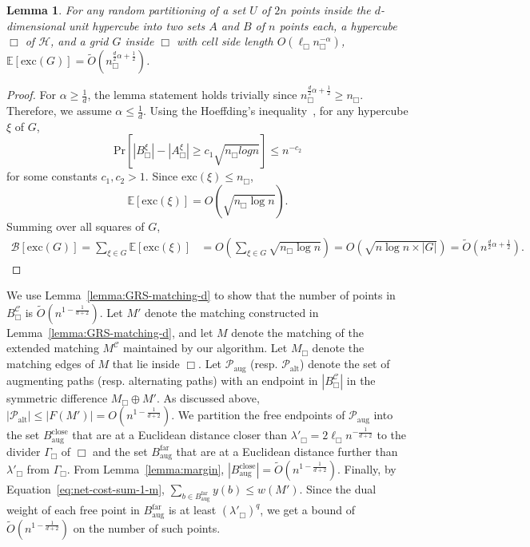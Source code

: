 \documentclass[11pt,onecolumn]{article}
\def\mcB{{\mathcal{B}}}
\def\mcC{{\mathcal{C}}}
\def\mcH{{\mathcal{H}}}
\def\mcP{{\mathcal{P}}}
\def\mbE{{\mathbb{E}}}
\newcommand{\cell}{\Box}
\newcommand{\excess}{\mathrm{exc}}
\newcommand{\prob}[1]{\mathrm{Pr}\left[#1\right]}
\newcommand{\divider}[1]{\Gamma_{#1}}
\newtheorem{lemma}{Lemma}[section]
\begin{document}
\begin{lemma}\label{lemma:convergence_excess-d}
    For any random partitioning of a set $U$ of $2n$ points inside the $d$-dimensional unit hypercube into two sets $A$ and $B$ of $n$ points each, a hypercube $\cell$ of $\mcH$, and a grid $G$ inside $\cell$ with cell side length $O(\ell_\cell n_\cell^{-\alpha})$, $\mbE[\excess(G)]= \tilde{O}(n_\cell^{\frac{d}{2}\alpha + \frac{1}{2}})$. 
\end{lemma}
\begin{proof}
    For $\alpha\ge \frac{1}{d}$, the lemma statement holds trivially since $n_\cell^{\frac{d}{2}\alpha+\frac{1}{2}} \ge n_\cell$. Therefore, we assume $\alpha\le \frac{1}{d}$.
    Using the Hoeffding\textquoteright{}s inequality~\cite{hoeffding1994probability}, for any hypercube $\xi$ of $G$,
    \begin{equation*}
        \prob{|B_\cell^\xi| - |A_\cell^\xi|\ge c_1\sqrt{n_\cell log n}}\le n^{-c_2}\label{eq:excess-d}
    \end{equation*}
    for some constants $c_1, c_2 > 1$. Since $\excess(\xi)\le n_\cell$, 
    \begin{equation*}
        \mbE[\excess(\xi)]= O(\sqrt{n_\cell\log n}).
    \end{equation*}
    Summing over all squares of $G$,
    \begin{align*}
        \mcB[\excess(G)] = \sum_{\xi\in G} \mbE[\excess(\xi)] &=O\left(\sum_{\xi\in G} \sqrt{n_\cell\log n}\right) = O\left(\sqrt{n\log n\times |G|}\right) = \tilde{O}(n^{\frac{d}{2}\alpha+\frac{1}{2}}).\label{eq:excess-dense-d}
    \end{align*}
\end{proof}


We use Lemma~\ref{lemma:GRS-matching-d} to show that the number of points in $B_\cell^\mcC$ is $\tilde{O}(n^{1-\frac{1}{d+2}})$. Let $M'$ denote the matching constructed in Lemma~\ref{lemma:GRS-matching-d}, and let $M$ denote the matching of the extended matching $M^\mcC$ maintained by our algorithm. Let $M_\cell$ denote the matching edges of $M$ that lie inside $\cell$. 
Let $\mcP_{\mathrm{aug}}$ (resp. $\mcP_{\mathrm{alt}}$) denote the set of augmenting paths (resp. alternating paths) with an endpoint in $|B_\cell^\mcC|$ in the symmetric difference $M_\cell\oplus M'$.
As discussed above, $|\mcP_{\mathrm{alt}}|\le |F(M')|=O(n^{1-\frac{1}{d+2}})$. 
We partition the free endpoints of $\mcP_{\mathrm{aug}}$ into the set $B^{\mathrm{close}}_{\mathrm{aug}}$ that are at a Euclidean distance closer than $\lambda'_\cell=2\ell_\cell n^{-\frac{1}{d+2}}$ to the divider $\divider\cell$ of $\cell$ and the set $B^{\mathrm{far}}_{\mathrm{aug}}$ that are at a Euclidean distance further than $\lambda'_\cell$ from $\divider\cell$. From Lemma~\ref{lemma:margin},  $|B^{\mathrm{close}}_{\mathrm{aug}}|=\tilde{O}(n^{1-\frac{1}{d+2}})$. Finally, by Equation~\eqref{eq:net-cost-sum-1-m}, $\sum_{b\in B^{\mathrm{far}}_{\mathrm{aug}}}y(b) \le w(M')$. Since the dual weight of each free point in $B^{\mathrm{far}}_{\mathrm{aug}}$ is at least $(\lambda'_\cell)^q$, we get a bound of $\tilde{O}(n^{1-\frac{1}{d+2}})$ on the number of such points. 
\end{document}
